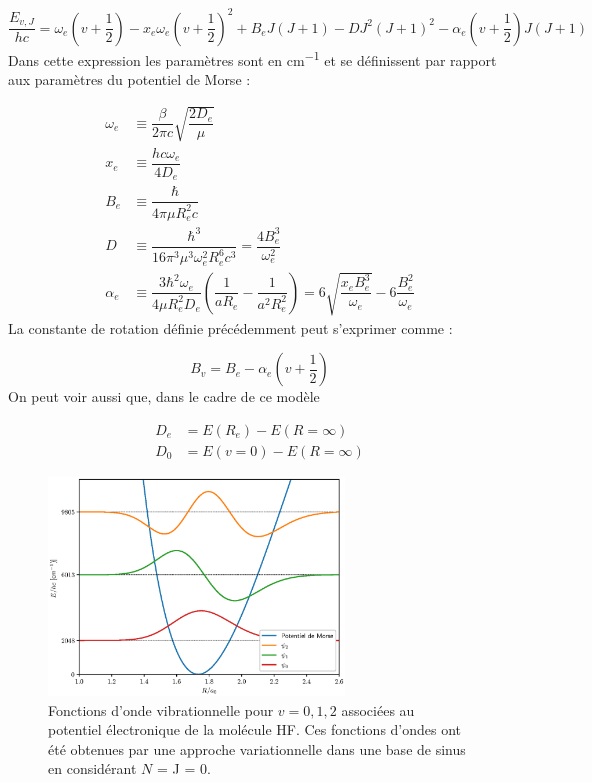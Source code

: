 \[ 
    \dfrac{E_{v,J}}{hc} = \omega_e\left(v+\dfrac{1}{2}\right)-x_e\omega_e\left(v+\dfrac{1}{2}\right)^2+B_eJ(J+1)-DJ^2(J+1)^2-\alpha_e\left(v+\dfrac{1}{2}\right)J(J+1)
\]
Dans cette expression les paramètres sont en \si{cm^{-1}} et se définissent par rapport
aux paramètres du potentiel de Morse :

\begingroup
\allowdisplaybreaks
\begin{align*}
    \omega_e &\equiv \dfrac{\beta}{2\pi c}\sqrt{\dfrac{2D_e}{\mu}}\\
    x_e &\equiv \dfrac{hc\omega_e}{4D_e}\\
    B_e &\equiv \dfrac{\hbar}{4\pi\mu R_e^2c}\\
    D &\equiv \dfrac{\hbar^3}{16\pi^3\mu^3\omega_e^2R_e^6c^3} = \dfrac{4B_e^3}{\omega_e^2}\\
    \alpha_e &\equiv \dfrac{3\hbar^2\omega_e}{4\mu R_e^2D_e}\left(\dfrac{1}{aR_e}-\dfrac{1}{a^2R_e^2}\right) = 6\sqrt{\dfrac{x_eB_e^3}{\omega_e}}-6\dfrac{B_e^2}{\omega_e}
\end{align*}
\endgroup
La constante de rotation définie précédemment peut s'exprimer comme :

\[ B_v = B_e -\alpha_e(v+\dfrac{1}{2}) \]
On peut voir aussi que, dans le cadre de ce modèle

\begin{align*}
    D_e &= E(R_e)-E(R=\infty)\\
    D_0 &= E(v=0)-E(R=\infty)
\end{align*}

\begin{figure}[htpb]
    \centering
    \includegraphics[width=0.7\textwidth]{Images3/niv_energie_morse.eps}
    \caption{Fonctions d’onde vibrationnelle pour $v= 0, 1, 2$ associées au potentiel
    électronique de la molécule HF. Ces fonctions d’ondes ont été obtenues par une
    approche variationnelle dans une base de sinus en considérant $N$ = J = 0.}
    \label{fig:Niv}
\end{figure}


